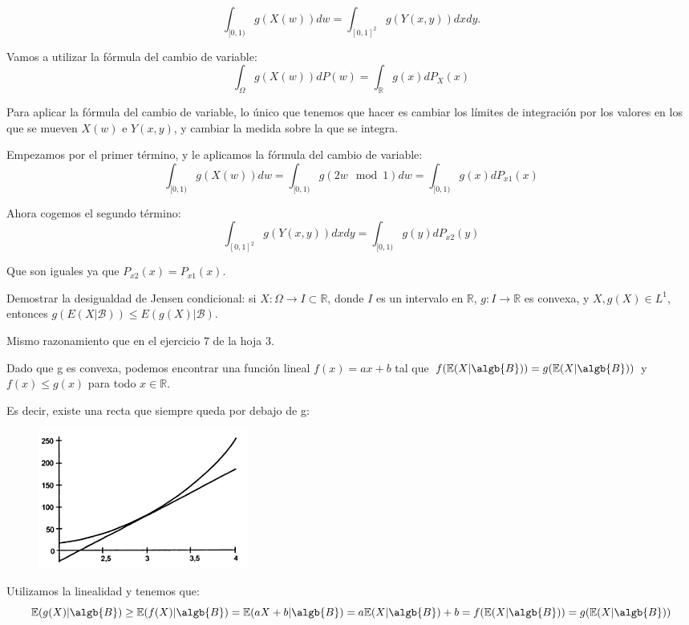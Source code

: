 \begin{problem}[1]
$$\int_{ [0,1)} g(X(w)) dw = \int_{ [0,1]^2} g(Y(x,y)) dx dy.$$

Vamos a utilizar la fórmula del cambio de variable:
\[
\int_{\Omega}g(X(w))dP(w)=\int_{\mathbb{R}}g(x)dP_X(x)
\]

Para aplicar la fórmula del cambio de variable, lo único que tenemos que hacer es cambiar los límites de integración por los valores en los que se mueven $X(w)$ e $Y(x,y)$, y cambiar la medida sobre la que se integra.

Empezamos por el primer término, y le aplicamos la fórmula del cambio de variable:
$$\int_{ [0,1)} g(X(w)) dw = \int_{ [0,1)} g(2w \mod{1}) dw= \int_{ [0,1)} g(x) dP_{x1}(x)$$

Ahora cogemos el segundo término:
$$\int_{ [0,1]^2} g(Y(x,y)) dx dy = \int_{ [0,1)} g(y) dP_{x2}(y)$$

Que son iguales ya que $P_{x2}(x) = P_{x1}(x)$.

\end{problem}


\begin{problem}[2] Demostrar la desigualdad de Jensen condicional: si $X:\Omega\to I\subset \mathbb{R}$, donde
$I$ es un intervalo en $\mathbb{R}$, $g:I\to \mathbb{R}$ es convexa, y $X, g(X) \in L^1$, entonces
 $g(E(X|\mathcal{B})) \le E(g(X)|\mathcal{B})$. 

\solution

\begin{expla}
Mismo razonamiento que en el ejercicio 7 de la hoja 3.
\end{expla}

Dado que g es convexa, podemos encontrar una función lineal $f(x)=ax+b$ tal que $f(\mathbb{E}(X|\algb{B})) = g(\mathbb{E}(X|\algb{B}))$ y $f(x)\leq g(x)$ para todo $x \in \mathbb{R}$.

Es decir, existe una recta que siempre queda por debajo de g:
\begin{figure}[h]
\centering
\includegraphics[page=1,scale=0.745]{img/jensen.png}
\end{figure} 

Utilizamos la linealidad y tenemos que:
\[
\mathbb{E}(g(X)|\algb{B}) \geq \mathbb{E}(f(X)|\algb{B}) = \mathbb{E}(aX+b|\algb{B})=a\mathbb{E}(X|\algb{B})+b=f(\mathbb{E}(X|\algb{B}))=g(\mathbb{E}(X|\algb{B}))
\]

\end{problem}

